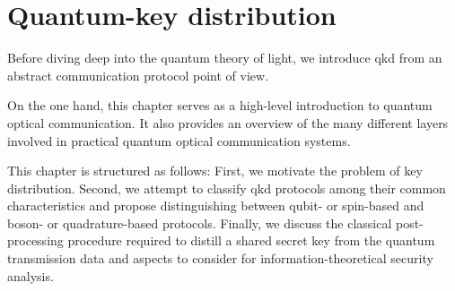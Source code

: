 \chapter{Quantum-key distribution}\label{ch:qkd}

Before diving deep into the quantum theory of light, we introduce \gls{qkd} from an abstract communication protocol point of view.

On the one hand, this chapter serves as a high-level introduction to quantum optical communication.
It also provides an overview of the many different layers involved in practical quantum optical communication systems.

This chapter is structured as follows:
First, we motivate the problem of key distribution.
Second, we attempt to classify \gls{qkd} protocols among their common characteristics and propose distinguishing between qubit- or spin-based and boson- or quadrature-based protocols.
Finally, we discuss the classical post-processing procedure required to distill a shared secret key from the quantum transmission data and aspects to consider for information-theoretical security analysis.
